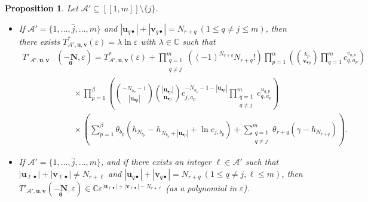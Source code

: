 \documentclass[a4paper]{amsart}
\newtheorem{proposition}[theorem]{Proposition}
\theoremstyle{remark}
\theoremstyle{definition}
\begin{document}
\begin{proposition}
\label{prop:computations_general_term_f_derivative}
Let $\mathcal{A}' \subseteq [\![ 1,m ]\!] \setminus \{ j \}$.
\begin{itemize}
\item[i)] If $\mathcal{A}'=\{ 1,\ldots,\widehat{j},\ldots,m \}$ and $|\mathbf{u}_{q \bullet}|+|\mathbf{v}_{q \bullet}|=N_{r+q} \ (1 \leq q \neq j \leq m)$, then there exists $T^*_{\mathcal{A}',\mathbf{u},\mathbf{v}}(\varepsilon)=\lambda \ln \varepsilon$ with $\lambda \in \mathbb{C}$ such that
\begin{align}
    T'_{\mathcal{A}',\mathbf{u},\mathbf{v}}&(\underset{\bm{\theta}}{-\mathbf{N}},\varepsilon) = T^*_{\mathcal{A}',\mathbf{u},\mathbf{v}}(\varepsilon) + \prod_{\substack{q=1 \\ q \neq j}}^{m} \left( (-1)^{N_{r+q}} N_{r+q}! \right) \prod_{p=1}^{\alpha} \left( \binom{k_p}{\mathbf{v}_{\bullet p}} \prod_{q=1}^m c_{q,a_p}^{v_{q,p}} \right) \label{eq:expression_general_term_C_1_i} \\
    & \qquad \times \prod_{p=1}^{\beta} \left( \binom{-N_{a_p}-1}{|\mathbf{u}_{\bullet p}|} \binom{|\mathbf{u}_{\bullet p}|}{\mathbf{u}_{\bullet p}} c_{j,a_p}^{-N_{a_p}-1-|\mathbf{u}_{\bullet p}|} \prod_{\substack{q=1 \\ q \neq j}}^{m} c_{q,a_p}^{u_{q,p}} \right) \nonumber \\
    & \qquad \times \left( \sum_{p=1}^{\beta} \theta_{b_p} (h_{N_{b_p}}-h_{N_{b_p}+|\mathbf{u}_{\bullet p}|} + \ln c_{j,b_p} ) + \sum_{\substack{q=1 \\ q \neq j}}^{m} \theta_{r+q} (\gamma-h_{N_{r+q}}) \right). \nonumber
\end{align}

\item[ii)] If $\mathcal{A}'=\{ 1,\ldots,\widehat{j},\ldots,m \}$, and if there exists an integer $\ell \in \mathcal{A}'$ such that $|\mathbf{u}_{\ell \bullet}|+|\mathbf{v}_{\ell \bullet}| \neq N_{r+\ell}$ and $|\mathbf{u}_{q \bullet}|+|\mathbf{v}_{q \bullet}|=N_{r+q} \ (1 \leq q \neq j,\ell \leq m)$, then $T'_{\mathcal{A}',\mathbf{u},\mathbf{v}}(\underset{\bm{\theta}}{-\mathbf{N}},\varepsilon) \in \mathbb{C}\varepsilon^{|\mathbf{u}_{\ell \bullet}|+|\mathbf{v}_{\ell \bullet}|-N_{r+\ell}}$ (as a polynomial in $\varepsilon$).


\end{itemize}
\end{proposition}
\end{document}
